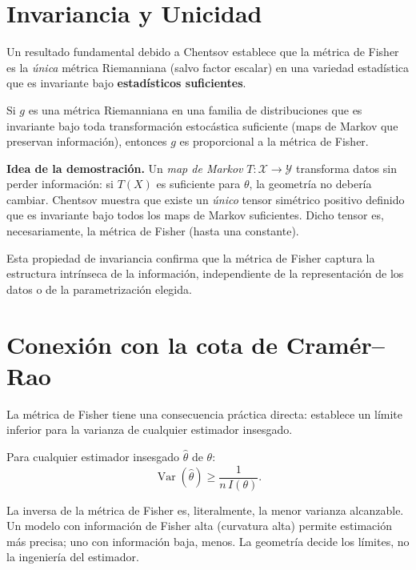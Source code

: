 \section{Invariancia y Unicidad}

Un resultado fundamental debido a Chentsov \cite{chentsov1982statistical} establece que la métrica de Fisher es la \emph{única} métrica Riemanniana (salvo factor escalar) en una variedad estadística que es invariante bajo \textbf{estadísticos suficientes}.

\begin{theorem}[Chentsov, 1972]
	Si $g$ es una métrica Riemanniana en una familia de distribuciones que es invariante bajo toda transformación estocástica suficiente (maps de Markov que preservan información), entonces $g$ es proporcional a la métrica de Fisher.
\end{theorem}

\textbf{Idea de la demostración.} Un \emph{map de Markov} $T : \mathcal{X} \to \mathcal{Y}$ transforma datos sin perder información: si $T(X)$ es suficiente para $\theta$, la geometría no debería cambiar. Chentsov muestra que existe un \emph{único} tensor simétrico positivo definido que es invariante bajo todos los maps de Markov suficientes. Dicho tensor es, necesariamente, la métrica de Fisher (hasta una constante).

Esta propiedad de invariancia confirma que la métrica de Fisher captura la estructura intrínseca de la información, independiente de la representación de los datos o de la parametrización elegida.

\section{Conexión con la cota de Cramér--Rao}

La métrica de Fisher tiene una consecuencia práctica directa: establece un límite inferior para la varianza de cualquier estimador insesgado.

\begin{theorem}
	Para cualquier estimador insesgado $\hat\theta$ de $\theta$:
	\[
	\operatorname{Var}(\hat\theta) \ge \frac{1}{n \, I(\theta)}.
	\]
\end{theorem}

La inversa de la métrica de Fisher es, literalmente, la menor varianza alcanzable. Un modelo con información de Fisher alta (curvatura alta) permite estimación más precisa; uno con información baja, menos. La geometría decide los límites, no la ingeniería del estimador.

